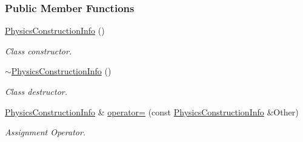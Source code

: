 \subsubsection*{Public Member Functions}
\begin{DoxyCompactItemize}
\item 
\hypertarget{classphys_1_1PhysicsConstructionInfo_a4ac8eccf1d73e949fdf753509a784c91}{
\hyperlink{classphys_1_1PhysicsConstructionInfo_a4ac8eccf1d73e949fdf753509a784c91}{PhysicsConstructionInfo} ()}
\label{classphys_1_1PhysicsConstructionInfo_a4ac8eccf1d73e949fdf753509a784c91}

\begin{DoxyCompactList}\small\item\em Class constructor. \item\end{DoxyCompactList}\item 
\hypertarget{classphys_1_1PhysicsConstructionInfo_ae795723590da96922fefbdf507381ba5}{
\hyperlink{classphys_1_1PhysicsConstructionInfo_ae795723590da96922fefbdf507381ba5}{$\sim$PhysicsConstructionInfo} ()}
\label{classphys_1_1PhysicsConstructionInfo_ae795723590da96922fefbdf507381ba5}

\begin{DoxyCompactList}\small\item\em Class destructor. \item\end{DoxyCompactList}\item 
\hyperlink{classphys_1_1PhysicsConstructionInfo}{PhysicsConstructionInfo} \& \hyperlink{classphys_1_1PhysicsConstructionInfo_a69aff9644621d3a76c6901bb94c2a33d}{operator=} (const \hyperlink{classphys_1_1PhysicsConstructionInfo}{PhysicsConstructionInfo} \&Other)
\begin{DoxyCompactList}\small\item\em Assignment Operator. \item\end{DoxyCompactList}\end{DoxyCompactItemize}

